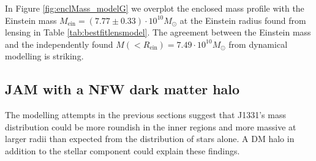 \documentclass[useAMS,usenatbib]{mnras}
\begin{document}
In Figure \ref{fig:enclMass_modelG} we overplot the enclosed mass profile with the Einstein mass $M_\text{ein} = (7.77 \pm 0.33) \cdot 10^{10} M_\odot$ at the Einstein radius found from lensing in Table \ref{tab:bestfitlensmodel}. The agreement between the Einstein mass and the independently found $M(<R_\text{ein}) = 7.49 \cdot 10^{10} M_\odot$ from dynamical modelling is striking.

\subsection{JAM with a NFW dark matter halo} \label{sec:results_JAM_NFW}

The modelling attempts in the previous sections suggest that J1331's mass distribution could be more roundish in the inner regions and more massive at larger radii than expected from the distribution of stars alone. A DM halo in addition to the stellar component could explain these findings. 
\end{document}
